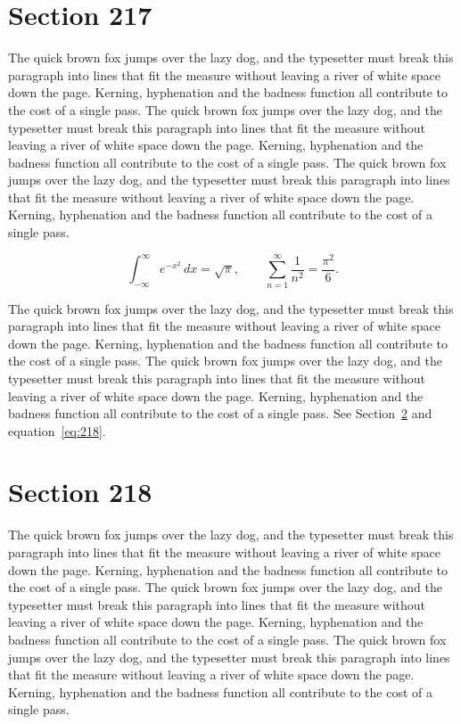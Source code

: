 \documentclass{article}
\begin{document}
\section{Section 217}
\label{sec:217}
The quick brown fox jumps over the lazy dog, and the typesetter must break this paragraph into lines that fit the measure without leaving a river of white space down the page. Kerning, hyphenation and the badness function all contribute to the cost of a single pass. The quick brown fox jumps over the lazy dog, and the typesetter must break this paragraph into lines that fit the measure without leaving a river of white space down the page. Kerning, hyphenation and the badness function all contribute to the cost of a single pass. The quick brown fox jumps over the lazy dog, and the typesetter must break this paragraph into lines that fit the measure without leaving a river of white space down the page. Kerning, hyphenation and the badness function all contribute to the cost of a single pass. 

\begin{equation}\label{eq:217}
\int_{-\infty}^{\infty} e^{-x^{2}}\,dx = \sqrt{\pi}, \qquad
\sum_{n=1}^{\infty} \frac{1}{n^{2}} = \frac{\pi^{2}}{6}.
\end{equation}

The quick brown fox jumps over the lazy dog, and the typesetter must break this paragraph into lines that fit the measure without leaving a river of white space down the page. Kerning, hyphenation and the badness function all contribute to the cost of a single pass. The quick brown fox jumps over the lazy dog, and the typesetter must break this paragraph into lines that fit the measure without leaving a river of white space down the page. Kerning, hyphenation and the badness function all contribute to the cost of a single pass. 
See Section~\ref{sec:218} and equation~\eqref{eq:218}.
\section{Section 218}
\label{sec:218}
The quick brown fox jumps over the lazy dog, and the typesetter must break this paragraph into lines that fit the measure without leaving a river of white space down the page. Kerning, hyphenation and the badness function all contribute to the cost of a single pass. The quick brown fox jumps over the lazy dog, and the typesetter must break this paragraph into lines that fit the measure without leaving a river of white space down the page. Kerning, hyphenation and the badness function all contribute to the cost of a single pass. The quick brown fox jumps over the lazy dog, and the typesetter must break this paragraph into lines that fit the measure without leaving a river of white space down the page. Kerning, hyphenation and the badness function all contribute to the cost of a single pass. 
\end{document}
